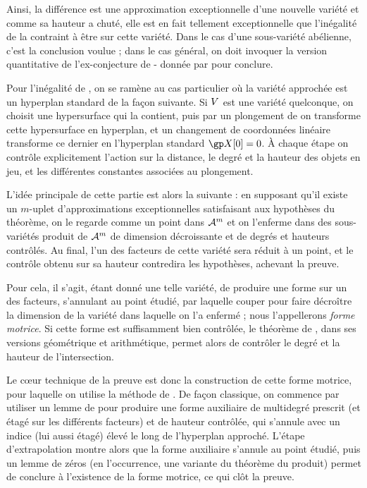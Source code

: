 Ainsi, la différence est une approximation exceptionnelle d'une nouvelle
variété et comme sa hauteur a chuté, elle est en fait tellement exceptionnelle
que l'inégalité de  la contraint à être sur cette variété. Dans
le cas d'une sous-variété abélienne, c'est la conclusion voulue ; dans le cas
général, on doit invoquer la version quantitative de l'ex-conjecture de
- donnée par  pour conclure.

\medskip

Pour l'inégalité de , on se ramène au cas particulier où la variété
approchée est un hyperplan standard de la façon suivante. Si \( V \) est
une variété quelconque, on choisit une hypersurface qui la contient, puis par
un plongement de  on transforme cette hypersurface en hyperplan,
et un changement de coordonnées linéaire transforme ce dernier en l'hyperplan
standard \( \vp[0] = 0 \). À chaque étape on contrôle explicitement l'action
sur la distance, le degré et la hauteur des objets en jeu, et les différentes
constantes associées au plongement.

L'idée principale de cette partie est alors la suivante : en supposant qu'il
existe un \( m \)-uplet d'approximations exceptionnelles satisfaisant aux
hypothèses du théorème, on le regarde comme un point dans \( \mathcal A^m \) et on
l'enferme dans des sous-variétés produit de \( \mathcal A^m \) de dimension
décroissante et de degrés et hauteurs contrôlés. Au final, l'un des facteurs
de cette variété sera réduit à un point, et le contrôle obtenu sur sa hauteur
contredira les hypothèses, achevant la preuve.

Pour cela, il s'agit, étant donné une telle variété, de produire une forme sur
un des facteurs, s'annulant au point étudié, par laquelle couper pour faire
décroître la dimension de la variété dans laquelle on l'a enfermé ; nous
l'appellerons \emph{forme motrice}. Si cette forme est suffisamment bien
contrôlée, le théorème de , dans ses versions géométrique et
arithmétique, permet alors de contrôler le degré et la hauteur de
l'intersection.

Le cœur technique de la preuve est donc la construction de cette forme
motrice, pour laquelle on utilise la méthode de . De façon
classique, on commence par utiliser un lemme de  pour produire une
forme auxiliaire de multidegré prescrit (et étagé sur les différents facteurs)
et de hauteur contrôlée, qui s'annule avec un indice (lui aussi étagé) élevé le
long de l'hyperplan approché. L'étape d'extrapolation montre alors que la
forme auxiliaire s'annule au point étudié, puis un lemme de zéros (en
l'occurrence, une variante du théorème du produit) permet de conclure à
l'existence de la forme motrice, ce qui clôt la preuve.


